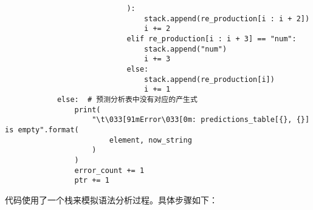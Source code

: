 \documentclass[lang=cn,11pt,a4paper]{elegantpaper}
\begin{document}
\begin{lstlisting}
                            ):
                                stack.append(re_production[i : i + 2])
                                i += 2
                            elif re_production[i : i + 3] == "num":
                                stack.append("num")
                                i += 3
                            else:
                                stack.append(re_production[i])
                                i += 1
            else:  # 预测分析表中没有对应的产生式
                print(
                    "\t\033[91mError\033[0m: predictions_table[{}, {}] is empty".format(
                        element, now_string
                    )
                )
                error_count += 1
                ptr += 1
\end{lstlisting}

代码使用了一个栈来模拟语法分析过程。具体步骤如下：
\end{document}
